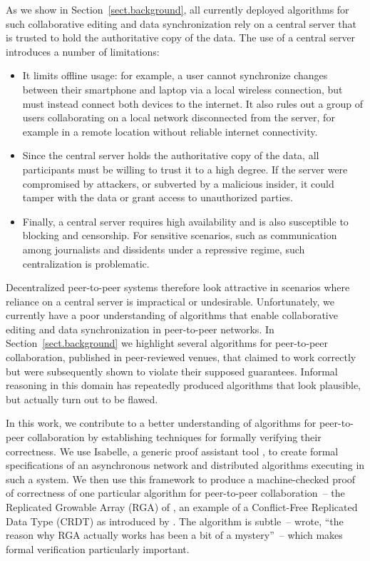 \documentclass[acmlarge,review,anonymous]{acmart}\settopmatter{printfolios=true}
\begin{document}
As we show in Section~\ref{sect.background}, all currently deployed algorithms for such
collaborative editing and data synchronization rely on a central server that is trusted to hold the
authoritative copy of the data. The use of a central server introduces a number of limitations:
\begin{itemize}
\item It limits offline usage: for example, a user cannot synchronize changes between their
    smartphone and laptop via a local wireless connection, but must instead connect both devices to
    the internet. It also rules out a group of users collaborating on a local network disconnected
    from the server, for example in a remote location without reliable internet connectivity.
\item Since the central server holds the authoritative copy of the data, all participants must be
    willing to trust it to a high degree. If the server were compromised by attackers, or subverted
    by a malicious insider, it could tamper with the data or grant access to unauthorized parties.
\item Finally, a central server requires high availability and is also susceptible to blocking and
    censorship. For sensitive scenarios, such as communication among journalists and dissidents
    under a repressive regime, such centralization is problematic.
\end{itemize}

Decentralized peer-to-peer systems therefore look attractive in scenarios where reliance on a
central server is impractical or undesirable. Unfortunately, we currently have a poor understanding
of algorithms that enable collaborative editing and data synchronization in peer-to-peer networks.
In Section~\ref{sect.background} we highlight several algorithms for peer-to-peer collaboration,
published in peer-reviewed venues, that claimed to work correctly but were subsequently shown to violate
their supposed guarantees. Informal reasoning in this domain has repeatedly produced algorithms that
look plausible, but actually turn out to be flawed.

In this work, we contribute to a better understanding of algorithms for peer-to-peer collaboration
by establishing techniques for formally verifying their correctness. We use Isabelle, a generic
proof assistant tool \cite{DBLP:conf/tphol/WenzelPN08}, to create formal specifications of an
asynchronous network and distributed algorithms executing in such a system. We then use this
framework to produce a machine-checked proof of correctness of one particular algorithm for
peer-to-peer collaboration~-- the Replicated Growable Array (RGA) of \citet{Roh:2011dw}, an example
of a Conflict-Free Replicated Data Type (CRDT) as introduced by
\citet{Shapiro:2011wy,Shapiro:2011un}.
The algorithm is subtle~-- \citet{Attiya:2016kh} wrote, ``the reason why RGA actually works has been
a bit of a mystery''~-- which makes formal verification particularly important.
\end{document}
